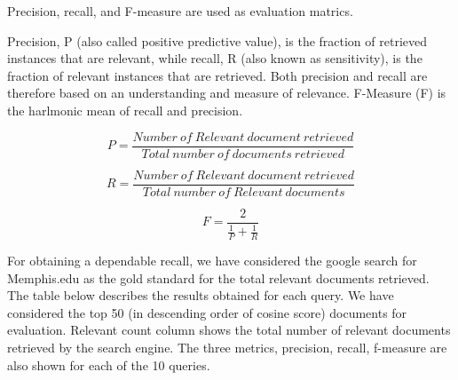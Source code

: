 \label{sec:results}
Precision, recall, and F-measure are used as evaluation matrics.

Precision, P (also called positive predictive value), is the fraction of retrieved instances that are relevant, while recall, R (also known as sensitivity), is the fraction of relevant instances that are retrieved. Both precision and recall are therefore based on an understanding and measure of relevance. F-Measure (F) is the harlmonic mean of recall and precision.

\begin{equation}
  P = \frac{{Number\ of\ Relevant\ document\ retrieved}}{{Total\ number\ of\ documents\ retrieved}}
\end{equation}

\begin{equation}
  R = \frac{{Number\ of\ Relevant\ document\ retrieved}}{{Total\ number\ of\ Relevant\ documents}}
\end{equation}

\begin{equation}
  F = \frac{2}{\frac{1}{P} + \frac{1}{R}}
\end{equation}

For obtaining a dependable recall, we have considered the google search for Memphis.edu as the gold standard for the total relevant documents retrieved. The table below describes the results obtained for each query. We have considered the top 50 (in descending order of cosine score) documents for evaluation. Relevant count column shows the total number of relevant documents retrieved by the search engine. The three metrics, precision, recall, f-measure are also shown for each of the 10 queries.

